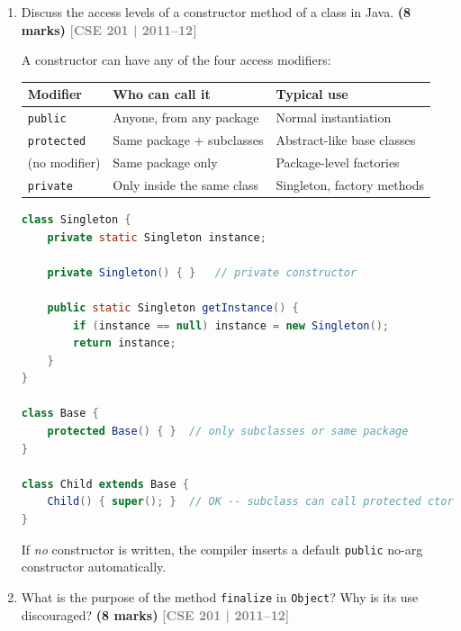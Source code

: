 \documentclass[12pt,a3paper]{article}
\newcommand{\yr}[1]{\hfill\textcolor{gray}{\small\textbf{[#1]}}}
\newcommand{\mk}[1]{\textcolor{orange!70!black}{\small\textbf{(#1 marks)}}}
\begin{document}
\begin{enumerate}
\item Discuss the access levels of a constructor method of a class in Java. \mk{8}
\yr{CSE 201 | 2011--12}

\begin{tcolorbox}[enhanced,breakable,ansbox,
  colback=cC!4,colframe=cC,boxrule=0.8pt,arc=5pt,
  title={\textbf{Answer --- Access Levels of Constructors in Java}},
  fonttitle=\bfseries\color{white},colbacktitle=cC]

A constructor can have any of the four access modifiers:

\begin{center}
\small
\begin{tabular}{@{}lll@{}}
\toprule
\textbf{Modifier} & \textbf{Who can call it} & \textbf{Typical use} \\
\midrule
\texttt{public}    & Anyone, from any package    & Normal instantiation \\
\texttt{protected} & Same package + subclasses   & Abstract-like base classes \\
(no modifier)      & Same package only           & Package-level factories \\
\texttt{private}   & Only inside the same class  & Singleton, factory methods \\
\bottomrule
\end{tabular}
\end{center}

\begin{lstlisting}[language=Java]
class Singleton {
    private static Singleton instance;

    private Singleton() { }   // private constructor

    public static Singleton getInstance() {
        if (instance == null) instance = new Singleton();
        return instance;
    }
}

class Base {
    protected Base() { }  // only subclasses or same package
}

class Child extends Base {
    Child() { super(); }  // OK -- subclass can call protected ctor
}
\end{lstlisting}

If \emph{no} constructor is written, the compiler inserts a default
\texttt{public} no-arg constructor automatically.
\end{tcolorbox}

\item What is the purpose of the method \texttt{finalize} in \texttt{Object}? Why is its use discouraged? \mk{8}
\yr{CSE 201 | 2011--12}


\end{enumerate}
\end{document}
